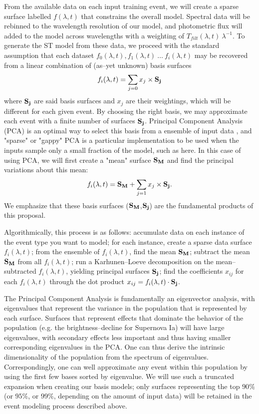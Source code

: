 From the available data on each input training event, we will create a sparse
surface labelled $f(\lambda, t)$ that constrains the overall model.  Spectral
data will be rebinned to the wavelength resolution of our model, and photometric
flux will added to the model across wavelengths with a weighting of
$T_{filt}(\lambda, t)~\lambda^{-1}$.  To generate the ST model from these data,
we proceed with the standard assumption that each dataset $f_0(\lambda, t),
f_1(\lambda, t)~\ldots~f_i(\lambda, t)$ may be recovered from a linear
combination of (as--yet unknown) basis surfaces $$f_i(\lambda, t) = \sum_{j=0}
x_j \times {\bf S_j}$$ where $\bf S_j$ are said basis surfaces and $x_j$ are
their weightings, which will be different for each given event.  By choosing the
right basis, we may approximate each event with a finite number of surfaces $\bf
S_j$. Principal Component Analysis (PCA) is an optimal way to select this basis
from a ensemble of input data \cite[e.g.][for astrophysical application to
galaxy spectra]{1995AJ....110.1071C}, and "sparse" or "gappy" PCA is a
particular implementation to be used when the inputs sample only a small
fraction of the model, such as here.  In this case of using PCA, we will first
create a "mean" surface ${\bf S_M}$ and find the principal variations about this
mean: $$f_i(\lambda, t) = {\bf S_M} + \sum_{j=1} x_j \times {\bf S_j}.$$ We
emphasize that these basis surfaces (${\bf S_M}$,${\bf S_j}$) are the
fundamental products of this proposal.

Algorithmically, this process is as follows: accumulate data on each instance of
the event type you want to model; for each instance, create a sparse data
surface $f_i(\lambda, t)$; from the ensemble of $f_i(\lambda, t)$, find the mean
${\bf S_M}$; subtract the mean ${\bf S_M}$ from all $f_i(\lambda, t)$; run a
Karhunen--Loeve decomposition \citep{Karhunen:47,Loeve:48} on the
mean--subtracted $f_i(\lambda, t)$, yielding principal surfaces ${\bf S_j}$;
find the coefficients $x_{ij}$ for each $f_i(\lambda, t)$ through the dot
product $x_{ij} = f_i(\lambda, t) \cdot {\bf S_j}$.

 The Principal Component
Analysis is fundamentally an eigenvector analysis, with eigenvalues that
represent the variance in the population that is represented by each surface.
Surfaces that represent effects that dominate the behavior of the population
(e.g. the brightness--decline for Supernova Ia) will have large eigenvalues,
with secondary effects less important and thus having smaller corresponding
eigenvalues in the PCA.  One can thus derive the intrinsic dimensionality of the
population from the spectrum of eigenvalues. Correspondingly, one can well
approximate any event within this population by using the first few bases sorted
by eigenvalue.  We will use such a truncated expansion when creating our basis
models; only surfaces representing the top $90\%$ (or $95\%$, or $99\%$,
depending on the amount of input data) will be retained in the event modeling
process described above.

